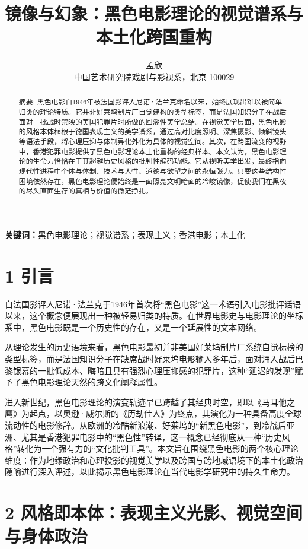 \documentclass[11pt]{article}
\title{镜像与幻象：黑色电影理论的视觉谱系与本土化跨国重构}
\author{孟欣\\中国艺术研究院戏剧与影视系，北京 100029}
\begin{document}
\maketitle

\begin{abstract}
摘要: 黑色电影自1946年被法国影评人尼诺·法兰克命名以来，始终展现出难以被简单归类的理论特质。它并非好莱坞制片厂自觉建构的类型标签，而是法国知识分子在战后面对一批战时禁映的美国犯罪片时所做的回溯性美学总结。在视觉美学层面，黑色电影的风格本体植根于德国表现主义的美学谱系，通过高对比度照明、深焦摄影、倾斜镜头等语法手段，将心理压抑与体制异化外化为具体的视觉空间。其次，在跨国流变的视野中，香港犯罪电影提供了黑色电影理论本土化重构的经典样本。本文认为，黑色电影理论的生命力恰恰在于其超越历史风格的批判性编码功能。它从视听美学出发，最终指向现代性进程中个体与体制、技术与人性、道德与欲望之间的永恒张力。只要这些结构性困境依然存在，黑色电影理论便始终是一面照亮文明暗面的冷峻镜像，促使我们在黑夜的尽头直面生存的真相与价值的微茫挣扎。
\end{abstract}

\noindent\textbf{关键词：}黑色电影理论；视觉谱系；表现主义；香港电影；本土化

\section{1 引言}

自法国影评人尼诺·法兰克于1946年首次将“黑色电影”这一术语引入电影批评话语以来，这个概念便展现出一种被轻易归类的特质。在世界电影史与电影理论的坐标系中，黑色电影既是一个历史性的存在，又是一个延展性的文本网络。

从理论发生的历史语境来看，黑色电影最初并非美国好莱坞制片厂系统自觉标榜的类型标签，而是法国知识分子在缺席战时好莱坞电影输入多年后，面对涌入战后巴黎银幕的一批低成本、晦暗且具有强烈心理压抑感的犯罪片，这种“延迟的发现”赋予了黑色电影理论天然的跨文化阐释属性。

进入新世纪，黑色电影理论的演变轨迹早已跨越了其经典时空，即以《马耳他之鹰》为起点，以奥逊·威尔斯的《历劫佳人》为终点，其演化为一种具备高度全球流动性的电影修辞。从欧洲的冷酷新浪潮、好莱坞的“新黑色电影”，到冷战后亚洲、尤其是香港犯罪电影中的“黑色性”转译，这一概念已经彻底从一种“历史风格”转化为一个强有力的“文化批判工具”。本文旨在围绕黑色电影的两个核心理论维度：作为地缘政治和心理投影的视觉美学以及跨国与跨地域语境下的本土化政治隐喻进行深入评述，以此揭示黑色电影理论在当代电影学研究中的持久生命力。

\section{2 风格即本体：表现主义光影、视觉空间与身体政治}
\end{document}
